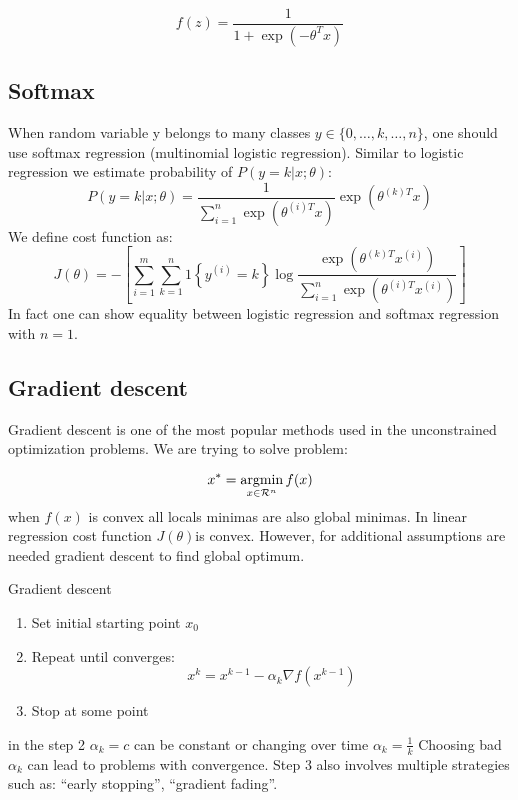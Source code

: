 \begin{equation} 
	f(z)=\frac{1}{1+\exp(-\theta^Tx)}
\end{equation}


\subsection{Softmax}
\label{softmax}
When random variable y belongs to many classes $y \in \{0,\ldots,k,\ldots,n\}$, one should use softmax regression (multinomial logistic regression). Similar to logistic regression we estimate probability of $P(y = k|x;\theta)$:
\begin{equation}
	P(y = k|x;\theta)=\frac{1}{\sum\limits^{n}_{i=1}\exp(\theta^{(i)T}x)} \exp(\theta^{(k)T}x)
\end{equation}
We define cost function as:
\begin{equation}
	J(\theta)=-\left[\sum\limits^m_{i=1} \sum\limits^n_{k=1} 1\left\{ y^{(i)}=k \right\}   \log\frac{\exp(\theta^{(k)T}x^{(i)})}{\sum\limits^{n}_{i=1}\exp(\theta^{(i)T}x^{(i)})}  \right]
\end{equation}
In fact one can show equality between logistic regression and softmax regression with $n=1$.


\subsection{Gradient descent}
Gradient descent \parencite{boyd_convex_2004} is one of the most popular methods used in the unconstrained optimization problems. We are trying to solve problem: 

\begin{equation}
	x^{*}=\operatorname*{argmin}\limits_{x \in \mathcal{R}^n}f(x)
\end{equation}
when $f(x)$ is convex all locals minimas are also global minimas. In linear regression cost function $J(\theta)$is convex. However, for additional assumptions are needed gradient descent to find global optimum. 

\begin{algorithm} Gradient descent
	\begin{enumerate}
		\item Set initial starting point $x_0$
		\item Repeat until converges:
			$$x^{k}=x^{k-1}-\alpha_k \nabla f(x^{k-1})$$
		\item Stop at some point 
	\end{enumerate}
in the step 2 $\alpha_k=c$ can be constant or changing over time $\alpha_k=\frac{1}{k}$
Choosing bad $\alpha_k$ can lead to problems with convergence.
Step 3 also involves multiple strategies such as: ``early stopping'', ``gradient fading''.
\end{algorithm}

